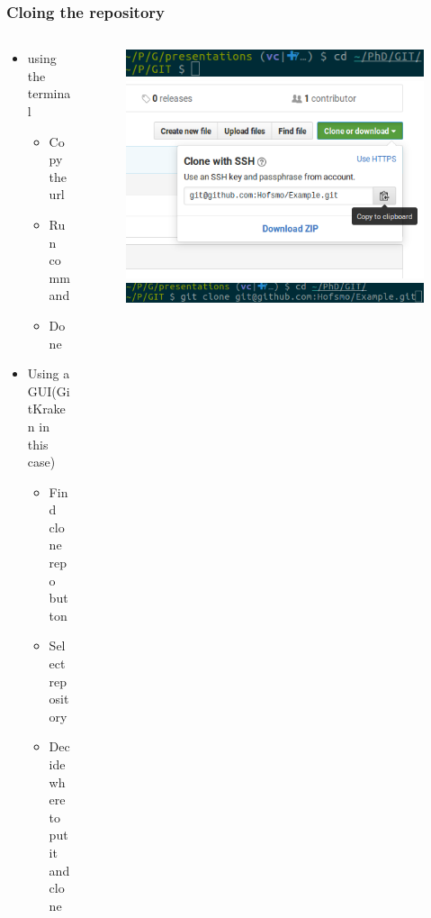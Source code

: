\begin{frame}
	\frametitle{Cloing the repository}
	\begin{columns}
		\begin{column}{0.4\textwidth}
			\begin{itemize}[<+->]
				\item using the terminal
					\begin{itemize}[<+->]
						\item Copy the url
						\item Run command
						\item Done
					\end{itemize}
				\item Using a GUI(GitKraken in this case)
					\begin{itemize}[<+->]
						\item Find clone repo button
						\item Select repository
						\item Decide where to put it and clone
					\end{itemize}
			\end{itemize}
		\end{column}
		\begin{column}{0.6\textwidth}
			\begin{figure}
				\centering
				\begin{overprint}
					\includegraphics[width=\textwidth]{./pictures/term.png}
					\onslide<2>\includegraphics[width=\textwidth]{./pictures/copy_url.png}
					\onslide<3>\includegraphics[width=\textwidth]{./pictures/clone_term.png}

\end{overprint}
\end{figure}
\end{column}
\end{columns}
\end{frame}
